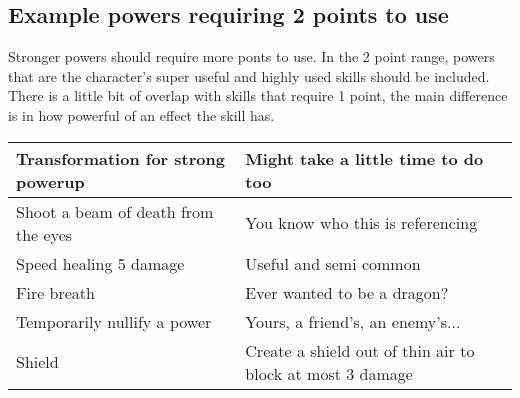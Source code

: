 \begin{flushleft}
\section*{Example powers requiring 2 points to use}
Stronger powers should require more ponts to use. In the 2 point range, powers
that are the character's super useful and highly used skills should be
included. There is a little bit of overlap with skills that require 1 point,
the main difference is in how powerful of an effect the skill has.

\begin{center}
\begin{tabular}{ |p{6cm}|p{6cm}|}
\hline
Transformation for strong powerup & Might take a little time to do too \\
\hline
Shoot a beam of death from the eyes & You know who this is referencing \\
\hline
Speed healing 5 damage & Useful and semi common \\
\hline
Fire breath & Ever wanted to be a dragon? \\
\hline
Temporarily nullify a power & Yours, a friend's, an enemy's...\\
\hline
 Shield & Create a shield out of thin air to block at most 3 damage \\
\hline
\end{tabular}
\end{center}

\end{flushleft}
